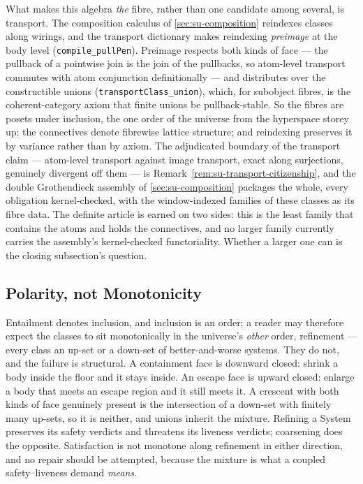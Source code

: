 What makes this algebra \emph{the} fibre, rather than one
candidate among several, is transport. The composition calculus of
\autoref{sec:su-composition} reindexes classes along wirings, and
the transport dictionary makes reindexing \emph{preimage} at the
body level (\texttt{compile\_pullPen}). Preimage respects both
kinds of face --- the pullback of a pointwise join is the join of
the pullbacks, so atom-level transport commutes with atom
conjunction definitionally --- and distributes over the
constructible unions (\texttt{transportClass\_union}), which, for
subobject fibres, is the coherent-category axiom that finite
unions be pullback-stable. So the fibres are posets under
inclusion, the one order of the universe from the hyperspace
storey up; the connectives denote fibrewise lattice structure; and
reindexing preserves it by variance rather than by axiom. The
adjudicated boundary of the transport claim --- atom-level
transport against image transport, exact along surjections,
genuinely divergent off them --- is
Remark~\ref{rem:su-transport-citizenship}, and the double
Grothendieck assembly of \autoref{sec:su-composition} packages the
whole, every obligation kernel-checked, with the window-indexed
families of these classes as its fibre data. The definite article
is earned on two sides: this is the least family that contains the
atoms and holds the connectives, and no larger family currently
carries the assembly's kernel-checked functoriality. Whether a
larger one can is the closing subsection's question.

\subsection{Polarity, not Monotonicity}

Entailment denotes inclusion, and inclusion is an order; a reader
may therefore expect the classes to sit monotonically in the
universe's \emph{other} order, refinement --- every class an
up-set or a down-set of better-and-worse systems. They do not, and
the failure is structural. A containment face is downward closed:
shrink a body inside the floor and it stays inside. An escape face
is upward closed: enlarge a body that meets an escape region and
it still meets it. A crescent with both kinds of face genuinely
present is the intersection of a down-set with finitely many
up-sets, so it is neither, and unions inherit the mixture.
Refining a System preserves its safety verdicts and threatens its
liveness verdicts; coarsening does the opposite. Satisfaction is
not monotone along refinement in either direction, and no repair
should be attempted, because the mixture is what a coupled
safety--liveness demand \emph{means}.


